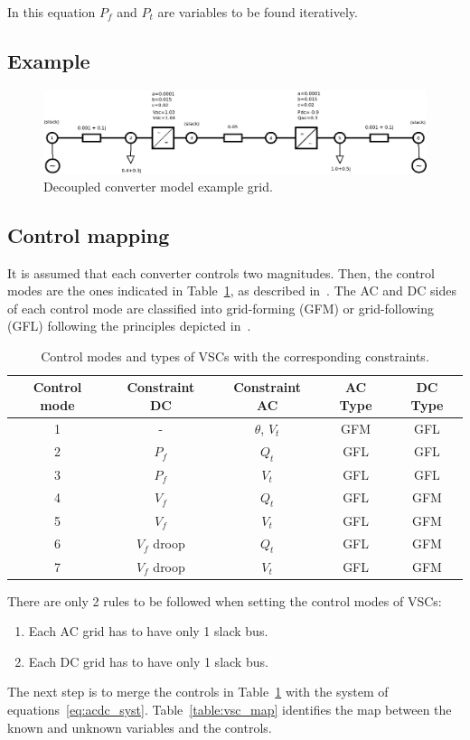 \documentclass[11pt]{article}
\begin{document}
	In this equation $P_f$ and $P_t$ are variables to be found iteratively.
	
	
	\subsection{Example}
		
	
	
	\begin{figure}[h!]
		\centering
		\includegraphics[width=1.0\linewidth]{acdc_6bus_diagram}
		\caption{Decoupled converter model example grid.}
		\label{fig:acdc6busdiagram}
	\end{figure}

	\subsection{Control mapping}
	It is assumed that each converter controls two magnitudes. Then, the control modes are the ones indicated in Table~\ref{table:contr_vsc}, as described in~\cite{alvarez2021universal}. The AC and DC sides of each control mode are classified into grid-forming (GFM) or grid-following (GFL) following the principles depicted in~\cite{gomis2020principles}.

	\begin{table}[!htb]\centering
		\caption{Control modes and types of VSCs with the corresponding constraints.}
		\begin{tabular}{ccccc}
			\hline
			\textbf{Control mode} & \textbf{Constraint DC} & \textbf{Constraint AC} & \textbf{AC Type} & \textbf{DC Type} \\
			\hline
			\hline
			1 & - & $\theta$, $V_t$ & GFM & GFL \\
			2 & $P_f$ & $Q_t$ & GFL & GFL \\
			3 & $P_f$ & $V_t$ & GFL & GFL \\
			4 & $V_f$ & $Q_t$ & GFL & GFM \\
			5 & $V_f$ & $V_t$ & GFL & GFM \\
			6 & $V_f$ droop & $Q_t$ & GFL & GFM \\
			7 & $V_f$ droop & $V_t$ & GFL & GFM \\
			\hline
		\end{tabular}
		\label{table:contr_vsc}
	\end{table}
There are only 2 rules to be followed when setting the control modes of VSCs:
\begin{enumerate}
	\item Each AC grid has to have only 1 slack bus.
	\item Each DC grid has to have only 1 slack bus.
\end{enumerate}
The next step is to merge the controls in Table~\ref{table:contr_vsc} with the system of equations~\eqref{eq:acdc_syst}. Table~\ref{table:vsc_map} identifies the map between the known and unknown variables and the controls.
\end{document}
